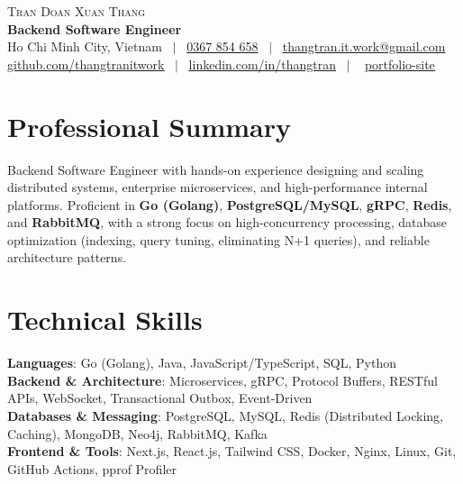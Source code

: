 \documentclass[a4paper,10pt]{article}
\begin{document}
\begin{center}
    {\LARGE \scshape Tran Doan Xuan Thang} \\ \vspace{2pt}
    {\textbf{Backend Software Engineer}} \\ \vspace{3pt}
    \small
    Ho Chi Minh City, Vietnam \ $|$ \
    \href{tel:0367854658}{0367 854 658} \ $|$ \
    \href{mailto:thangtran.it.work@gmail.com}{\underline{thangtran.it.work@gmail.com}} \\ \vspace{2pt}
    \href{https://github.com/thangtranitwork}{\underline{github.com/thangtranitwork}} \ $|$ \
    \href{https://www.linkedin.com/in/%C4%91o%C3%A0n-xu%C3%A2n-th%E1%BA%AFng-tr%E1%BA%A7n-441106312}{\underline{linkedin.com/in/thangtran}} \ $|$ \
    \href{https://thangtranitwork.github.io/portfolio/}{\underline{portfolio-site}}
\end{center}

\section{Professional Summary}
\small{
Backend Software Engineer with hands-on experience designing and scaling distributed systems, enterprise microservices, and high-performance internal platforms. Proficient in \textbf{Go (Golang)}, \textbf{PostgreSQL/MySQL}, \textbf{gRPC}, \textbf{Redis}, and \textbf{RabbitMQ}, with a strong focus on high-concurrency processing, database optimization (indexing, query tuning, eliminating N+1 queries), and reliable architecture patterns.
}

\section{Technical Skills}
 \begin{itemize}[leftmargin=0.15in, label={}]
    \small{\item{
     \textbf{Languages}{: Go (Golang), Java, JavaScript/TypeScript, SQL, Python} \\ \vspace{1pt}
     \textbf{Backend \& Architecture}{: Microservices, gRPC, Protocol Buffers, RESTful APIs, WebSocket, Transactional Outbox, Event-Driven} \\ \vspace{1pt}
     \textbf{Databases \& Messaging}{: PostgreSQL, MySQL, Redis (Distributed Locking, Caching), MongoDB, Neo4j, RabbitMQ, Kafka} \\ \vspace{1pt}
     \textbf{Frontend \& Tools}{: Next.js, React.js, Tailwind CSS, Docker, Nginx, Linux, Git, GitHub Actions, pprof Profiler}
    }}
 \end{itemize}
\end{document}
